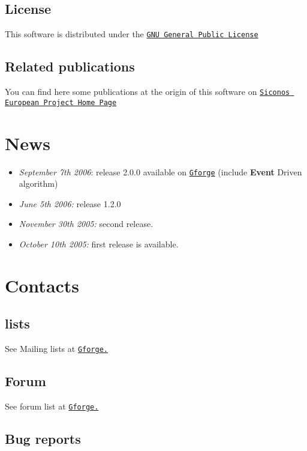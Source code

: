 \hypertarget{index_license}{}\subsection{License}\label{index_license}
This software is distributed under the \href{http://www.gnu.org/copyleft/gpl.html}{\tt GNU General Public License} \hypertarget{index_publi}{}\subsection{Related publications}\label{index_publi}
You can find here some publications at the origin of this software on \href{http://siconos.inrialpes.fr/}{\tt Siconos European Project Home Page} \hypertarget{index_news}{}\section{News}\label{index_news}
\begin{itemize}
\item {\em  September 7th 2006\/}: release 2.0.0 available on \href{http://gforge.inria.fr/projects/siconos}{\tt Gforge} (include {\bf Event} Driven algorithm)\item {\em  June 5th 2006:\/} release 1.2.0\item {\em  November 30th 2005:\/} second release.\item {\em  October 10th 2005:\/} first release is available. \end{itemize}
\hypertarget{index_contacts}{}\section{Contacts}\label{index_contacts}
\hypertarget{index_Mailing}{}\subsection{lists}\label{index_Mailing}
See Mailing lists at \href{https://gforge.inria.fr/mail/?group_id=9}{\tt Gforge.} \hypertarget{index_forum}{}\subsection{Forum}\label{index_forum}
See forum list at \href{https://gforge.inria.fr/forum/?group_id=9}{\tt Gforge.} \hypertarget{index_bug}{}\subsection{Bug reports}\label{index_bug}
